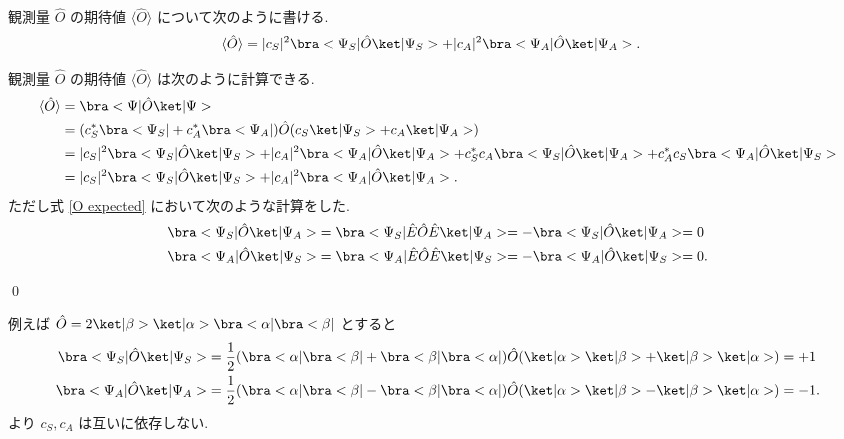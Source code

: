 \documentclass[uplatex,dvipdfmx,a4paper,11pt]{jlreq}
\makeatletter
\numberwithin{equation}{section}
\theoremstyle{definition}
\renewenvironment{proof}[1][\proofname]{\par
  \normalfont
  \topsep6\p@\@plus6\p@ \trivlist
  \item[\hskip\labelsep{\bfseries #1}\@addpunct{\bfseries}]\ignorespaces\quad\par
}{
  \qed\endtrivlist\@endpefalse
}
\renewcommand\proofname{証明}
\makeatother
\begin{document}
\begin{proposition}[Q21-1(ix)]
  観測量 $\hat{O}$ の期待値 $\langle\hat{O}\rangle$ について次のように書ける.
  \begin{align}
    \langle\hat{O}\rangle & = |c_S|^2\bra<\Psi_S|\hat{O}\ket|\Psi_S> + |c_A|^2\bra<\Psi_A|\hat{O}\ket|\Psi_A>.
  \end{align}
\end{proposition}
\begin{proof}
  観測量 $\hat{O}$ の期待値 $\langle\hat{O}\rangle$ は次のように計算できる.
  \begin{align}
    \langle\hat{O}\rangle & = \bra<\Psi|\hat{O}\ket|\Psi>                                                                                                                                         \\
                          & = (c_S^*\bra<\Psi_S| + c_A^*\bra<\Psi_A|)\hat{O}(c_S\ket|\Psi_S> + c_A\ket|\Psi_A>)                                                                                   \\
                          & = |c_S|^2\bra<\Psi_S|\hat{O}\ket|\Psi_S> + |c_A|^2\bra<\Psi_A|\hat{O}\ket|\Psi_A> + c_S^*c_A\bra<\Psi_S|\hat{O}\ket|\Psi_A> + c_A^*c_S\bra<\Psi_A|\hat{O}\ket|\Psi_S> \\
                          & = |c_S|^2\bra<\Psi_S|\hat{O}\ket|\Psi_S> + |c_A|^2\bra<\Psi_A|\hat{O}\ket|\Psi_A>.\label{O expected}
  \end{align}
  ただし式 \eqref{O expected} において次のような計算をした.
  \begin{align}
    \bra<\Psi_S|\hat{O}\ket|\Psi_A> & = \bra<\Psi_S|\hat{E}\hat{O}\hat{E}\ket|\Psi_A> = -\bra<\Psi_S|\hat{O}\ket|\Psi_A> = 0  \\
    \bra<\Psi_A|\hat{O}\ket|\Psi_S> & = \bra<\Psi_A|\hat{E}\hat{O}\hat{E}\ket|\Psi_S> = -\bra<\Psi_A|\hat{O}\ket|\Psi_S> = 0.
  \end{align}
\end{proof}

\begin{problem}[Q21-1(x)]
例えば $\hat{O} = 2\ket|\beta>\ket|\alpha>\bra<\alpha|\bra<\beta|$ とすると
\begin{align}
  \bra<\Psi_S|\hat{O}\ket|\Psi_S> & = \frac{1}{2}(\bra<\alpha|\bra<\beta| + \bra<\beta|\bra<\alpha|)\hat{O}(\ket|\alpha>\ket|\beta> + \ket|\beta>\ket|\alpha>) = +1  \\
  \bra<\Psi_A|\hat{O}\ket|\Psi_A> & = \frac{1}{2}(\bra<\alpha|\bra<\beta| - \bra<\beta|\bra<\alpha|)\hat{O}(\ket|\alpha>\ket|\beta> - \ket|\beta>\ket|\alpha>) = -1.
\end{align}
より $c_S, c_A$ は互いに依存しない.
\end{problem}
\end{document}
